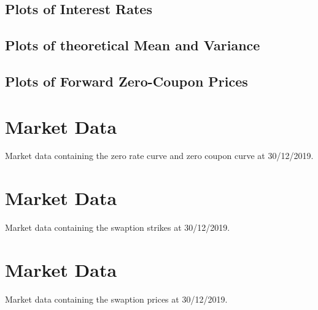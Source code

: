 \subsection{Plots of Interest Rates}
	
\subsection{Plots of theoretical Mean and Variance}
	
\subsection{Plots of Forward Zero-Coupon Prices}
	
\appendix
\section{Market Data}
	
\begin{table}
	\marketDataA
\centering
\caption{Market data containing the zero rate curve and zero coupon curve at 30/12/2019.}
\label{tab:market_dataA}
\end{table}
\section{Market Data}
	
\begin{table}
	\strikeSwaptionA
\centering
\caption{Market data containing the swaption strikes at 30/12/2019.}
\label{tab:strike_swaptionA}
\end{table}
\section{Market Data}
	
\begin{table}
	\marketSwaptionA
\centering
\caption{Market data containing the swaption prices at 30/12/2019.}
\label{tab:market_swaptionA}
\end{table}
